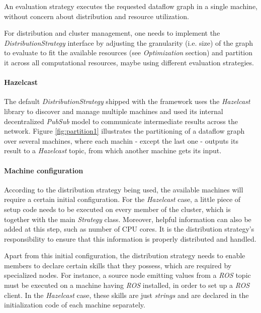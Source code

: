 \documentclass[sigplan,review,anonymous]{acmart}
\begin{document}
An evaluation strategy executes the requested dataflow graph in a single
machine, without concern about distribution and resource utilization.

For distribution and cluster management, one needs to implement
the \textit{DistributionStrategy} interface by adjusting the granularity (i.e. size) of
the graph to evaluate to fit the available resources (see \textit{Optimization} section)
and partition it across all computational resources, maybe using different evaluation strategies.

\paragraph{Hazelcast}
The default \textit{DistributionStrategy} shipped with the framework uses
the \textit{Hazelcast} library to discover and
manage multiple machines and used its internal decentralized \textit{PubSub} model to communicate
intermediate results across the network. Figure \ref{fig:partition1} illustrates
the partitioning of a dataflow graph over several machines, where each machin
- except the last one - outputs its result to a \textit{Hazelcast} topic, from which
another machine gets its input.


\paragraph{Machine configuration}
According to the distribution strategy being used, the available machines will
require a certain initial configuration. For the \textit{Hazelcast} case, a
little piece of setup code needs to be executed on every member of the cluster,
which is together with the main \textit{Strategy} class. Moreover, helpful
information can also be added at this step, such as number of CPU cores. It is
the distribution strategy's responsibility to ensure that this information is
properly distributed and handled.

Apart from this initial configuration, the distribution strategy needs to enable
members to declare certain skills that they possess, which are required by
specialized nodes. For instance, a source node emitting values from a
\textit{ROS} topic must be executed on a machine having \textit{ROS} installed,
in order to set up a \textit{ROS} client. In the \textit{Hazelcast} case, these
skills are just \textit{strings} and are declared in the initialization code of
each machine separately.
\end{document}

